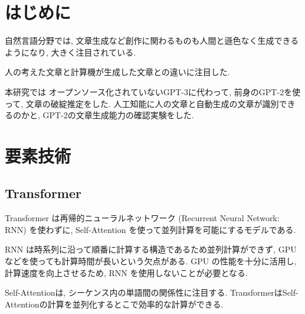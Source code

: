 \documentclass[twocolumn]{jarticle}     %
\begin{document}


\section{はじめに}


自然言語分野では, 文章生成など創作に関わるものも人間と遜色なく生成できるようになり,
大きく注目されている.

人の考えた文章と計算機が生成した文章との違いに注目した.


本研究では
オープンソース化されていないGPT-3に代わって,
前身のGPT-2を使って, 文章の破綻推定をした.
人工知能に人の文章と自動生成の文章が識別できるのかと,
GPT-2の文章生成能力の確認実験をした.

\section{要素技術}
\subsection{Transformer}
Transformer\cite{DBLP:journals/corr/VaswaniSPUJGKP17} は再帰的ニューラルネットワーク (Recurrent Neural Network: RNN)\cite{mikolov2010recurrent} を使わずに, Self-Attention を使って並列計算を可能にするモデルである.

RNN は時系列に沿って順番に計算する構造であるため並列計算ができず,
GPU などを使っても計算時間が長いという欠点がある.
GPU の性能を十分に活用し, 計算速度を向上させるため, RNN を使用しないことが必要となる.

Self-Attentionは, シーケンス内の単語間の関係性に注目する.
TransformerはSelf-Attentionの計算を並列化するとこで効率的な計算ができる.

\end{document}
